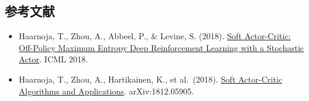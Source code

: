 \hypertarget{ux53c2ux8003ux6587ux732e-61}{%
\subsection{参考文献}\label{ux53c2ux8003ux6587ux732e-61}}

\vspace{0.25em}
\begin{itemize}
\tightlist
\item
  Haarnoja, T., Zhou, A., Abbeel, P., \& Levine, S. (2018). \href{https://arxiv.org/abs/1801.01290}{Soft Actor-Critic: Off-Policy Maximum Entropy Deep Reinforcement Learning with a Stochastic Actor}. ICML 2018.
\item
  Haarnoja, T., Zhou, A., Hartikainen, K., et al.~(2018). \href{https://arxiv.org/abs/1812.05905}{Soft Actor-Critic Algorithms and Applications}. arXiv:1812.05905.
\end{itemize}

\clearpage
